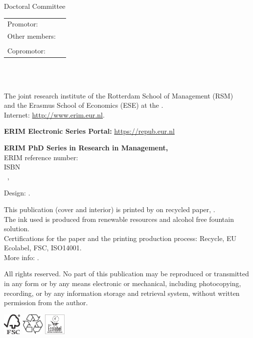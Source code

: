 \thispagestyle{empty}
\noindent Doctoral Committee\\
\emptyline
{\setlength{\tabcolsep}{0pt}
\begin{tabular}{ll}
	\rule{0pt}{2em}Promotor: & \qquad\MyPromotor \\
	\rule{0pt}{2em}Other members: & \qquad\MyMemberOne \\
	& \qquad\MyMemberTwo \\
	\rule{0pt}{2em}Copromotor: & \qquad\MyCoPromotor\\
\end{tabular}
}\\
\vfill
{\footnotesize\parindent0pt
\textbf{\MyInstitute}\\
The joint research institute of the Rotterdam School of Management (RSM)\\
and the Erasmus School of Economics (ESE) at the \MyUniversity.\\
Internet: \url{http://www.erim.eur.nl}.\par
\emptyline
\textbf{ERIM Electronic Series Portal:} \url{https://repub.eur.nl}\par
\emptyline
\textbf{ERIM PhD Series in Research in Management, \MyERIMThesisIndex}\\
ERIM reference number: \MyERIMThesisReference\\
ISBN \MyISBN\\
\textcopyright\, \MyYear, \MyAuthor\par
\emptyline
Design: \MyDesigner.\par
\emptyline
This publication (cover and interior) is printed by \MyPrinter{} on recycled 
paper, \MyPaperType\textregistered.\\
The ink used is produced from renewable resources and alcohol free fountain 
solution.\\
Certifications for the paper and the printing production process: Recycle, EU 
Ecolabel, FSC\textregistered, ISO14001.\\
More info: \MyPrinterURL.\par
\emptyline
All rights reserved. No part of this publication may be reproduced or 
transmitted in any form or by any means electronic or mechanical, including 
photocopying, recording, or by any information storage and retrieval system, 
without written permission from the author.\par
\emptyline
\emptyline
\includegraphics[height=10.6mm]{./images/fsc}\qquad
\includegraphics[height=10.6mm]{./images/recycle}\qquad
\includegraphics[height=10.6mm]{./images/ecolabel}
}
